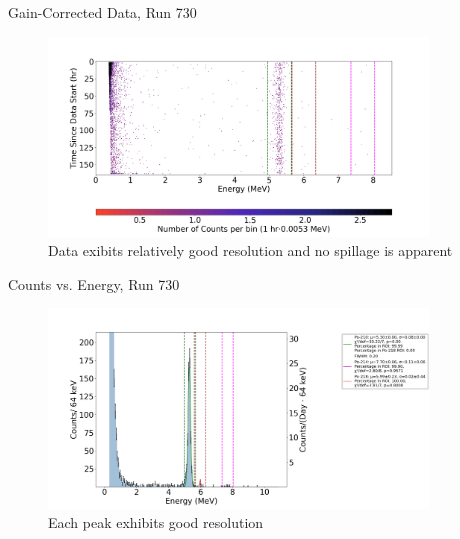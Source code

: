 \documentclass[aspectratio=169]{beamer}
\begin{document}
\begin{frame}{Gain-Corrected Data, Run 730}
    \begin{figure}
        \begin{center}
            \includegraphics[width=0.9\textwidth]
            {assets/730/CD.png}
            \caption{Data exibits relatively good resolution and no spillage is apparent}
        \end{center}
    \end{figure}
\end{frame}

\begin{frame}{Counts vs. Energy, Run 730}
    \begin{figure}
        \begin{center}
            \includegraphics[width=0.9\textwidth]
            {assets/730/CvE.png}
            \caption{Each peak exhibits good resolution}
        \end{center}
    \end{figure}
\end{frame}
\end{document}
